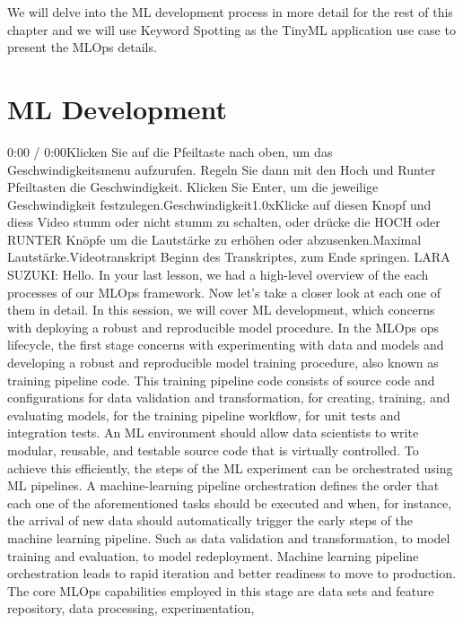    We will delve into the ML development process in more detail for the rest of this chapter and we will use Keyword Spotting as the TinyML application use case to present the MLOps details.
    
\section{ML Development}

    0:00 / 0:00Klicken Sie auf die Pfeiltaste nach oben, um das Geschwindigkeitsmenu aufzurufen. Regeln Sie dann mit den Hoch und Runter Pfeiltasten die Geschwindigkeit. Klicken Sie Enter, um die jeweilige Geschwindigkeit festzulegen.Geschwindigkeit1.0xKlicke auf diesen Knopf und diess Video stumm oder nicht stumm zu schalten, oder drücke die HOCH oder RUNTER Knöpfe um die Lautstärke zu erhöhen oder abzusenken.Maximal Lautstärke.Videotranskript
    Beginn des Transkriptes, zum Ende springen.
    LARA SUZUKI: Hello.
    In your last lesson, we had a high-level overview
    of the each processes of our MLOps framework.
    Now let's take a closer look at each one of them in detail.
    In this session, we will cover ML development,
    which concerns with deploying a robust and reproducible model procedure.
    In the MLOps ops lifecycle, the first stage
    concerns with experimenting with data and models
    and developing a robust and reproducible model training procedure, also known
    as training pipeline code.
    This training pipeline code consists of source code and configurations for data
    validation and transformation, for creating, training, and evaluating
    models, for the training pipeline workflow,
    for unit tests and integration tests.
    An ML environment should allow data scientists
    to write modular, reusable, and testable source
    code that is virtually controlled.
    To achieve this efficiently, the steps of the ML experiment
    can be orchestrated using ML pipelines.
    A machine-learning pipeline orchestration
    defines the order that each one of the aforementioned tasks should be executed
    and when, for instance, the arrival of new data
    should automatically trigger the early steps of the machine learning pipeline.
    Such as data validation and transformation,
    to model training and evaluation, to model redeployment.
    Machine learning pipeline orchestration leads to rapid iteration and better
    readiness to move to production.
    The core MLOps capabilities employed in this stage
    are data sets and feature repository, data processing, experimentation,
